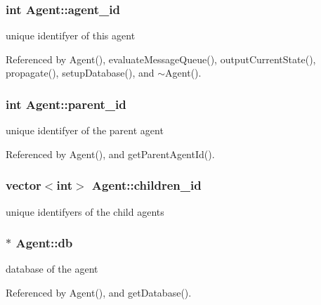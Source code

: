 \subsubsection[agent\_\-id]{\setlength{\rightskip}{0pt plus 5cm}int {\bf Agent::agent\_\-id}\hspace{0.3cm}{\tt  [protected]}}\label{classAgent_787d3996be0a2b2eb3a7809948fde5db}


unique identifyer of this agent 



Referenced by Agent(), evaluateMessageQueue(), outputCurrentState(), propagate(), setupDatabase(), and $\sim$Agent().
\subsubsection[parent\_\-id]{\setlength{\rightskip}{0pt plus 5cm}int {\bf Agent::parent\_\-id}\hspace{0.3cm}{\tt  [protected]}}\label{classAgent_9f4cdf9bf8fac6ad603cd0cbe1701e89}


unique identifyer of the parent agent 



Referenced by Agent(), and getParentAgentId().
\subsubsection[children\_\-id]{\setlength{\rightskip}{0pt plus 5cm}vector$<$int$>$ {\bf Agent::children\_\-id}\hspace{0.3cm}{\tt  [protected]}}\label{classAgent_e00abc7e59b8a193263cddf6bd9eca64}


unique identifyers of the child agents 

\subsubsection[db]{$\ast$ {\bf Agent::db}\hspace{0.3cm}{\tt  [protected]}}\label{classAgent_836fc0c732a08e7ad0ff40c70da61f40}


database of the agent 



Referenced by Agent(), and getDatabase().
